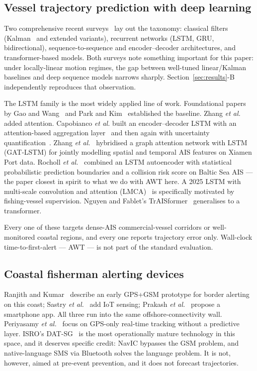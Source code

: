 \documentclass[conference]{IEEEtran}
\begin{document}
\subsection{Vessel trajectory prediction with deep learning}

Two comprehensive recent surveys~\cite{li2023,xie2025} lay out the taxonomy: classical filters (Kalman~\cite{kalman1960} and extended variants), recurrent networks (LSTM, GRU, bidirectional), sequence-to-sequence and encoder--decoder architectures, and transformer-based models. Both surveys note something important for this paper: under locally-linear motion regimes, the gap between well-tuned linear/Kalman baselines and deep sequence models narrows sharply. Section~\ref{sec:results}-B independently reproduces that observation.

The LSTM family is the most widely applied line of work. Foundational papers by Gao and Wang~\cite{gao2019} and Park and Kim~\cite{park2018} established the baseline. Zhang \emph{et al.}~\cite{zhang2020} added attention. Capobianco \emph{et al.} built an encoder--decoder LSTM with an attention-based aggregation layer~\cite{capobianco2021} and then again with uncertainty quantification~\cite{capobianco_fusion2021}. Zhang \emph{et al.}~\cite{gatlstm2023} hybridised a graph attention network with LSTM (GAT-LSTM) for jointly modelling spatial and temporal AIS features on Xiamen Port data. Rocholl \emph{et al.}~\cite{rocholl2025} combined an LSTM autoencoder with statistical probabilistic prediction boundaries and a collision risk score on Baltic Sea AIS --- the paper closest in spirit to what we do with AWT here. A 2025 LSTM with multi-scale convolution and attention (LMCA)~\cite{lmca2025} is specifically motivated by fishing-vessel supervision. Nguyen and Fablet's TrAISformer~\cite{nguyen2024} generalises to a transformer.

Every one of these targets dense-AIS commercial-vessel corridors or well-monitored coastal regions, and every one reports trajectory error only. Wall-clock time-to-first-alert --- AWT --- is not part of the standard evaluation.

\subsection{Coastal fisherman alerting devices}

Ranjith and Kumar~\cite{ranjith2014} describe an early GPS+GSM prototype for border alerting on this coast; Sastry \emph{et al.}~\cite{sastry2020} add IoT sensing; Prakash \emph{et al.}~\cite{prakash2021} propose a smartphone app. All three run into the same offshore-connectivity wall. Periyasamy \emph{et al.}~\cite{periyasamy2020} focus on GPS-only real-time tracking without a predictive layer. ISRO's DAT-SG~\cite{sacdatsg,dwivedi_navic} is the most operationally mature technology in this space, and it deserves specific credit: NavIC bypasses the GSM problem, and native-language SMS via Bluetooth solves the language problem. It is not, however, aimed at pre-event prevention, and it does not forecast trajectories.
\end{document}
